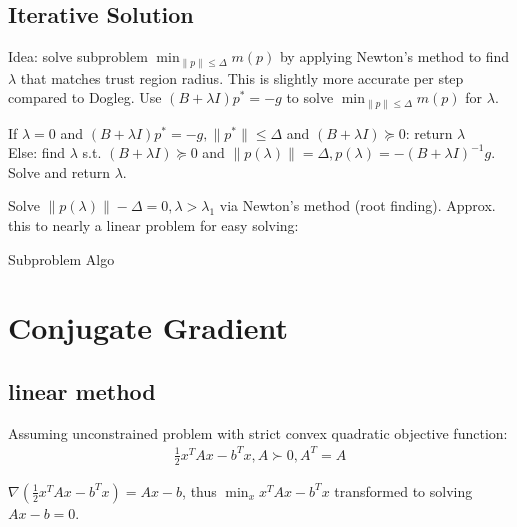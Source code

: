 \documentclass[8pt,letter]{article}
\begin{document}
\begin{multicols*}{2}
  \subsection{Iterative Solution}
  Idea: solve subproblem $\min_{\|p\| \leq \Delta} m(p)$ by applying Newton's method to find $\lambda$ that matches trust region radius. This is slightly more accurate per step compared to Dogleg. Use $(B+\lambda I)p^*=-g$ to solve $\min_{\|p\| \leq \Delta} m(p)$ for $\lambda$.

  If $\lambda=0$ and $(B+\lambda I)p^*=-g, \|p^*\| \leq \Delta$ and $(B+\lambda I) \succeq 0$: return $\lambda$\\
  Else: find $\lambda$ s.t. $(B+\lambda I) \succeq 0$ and $\|p(\lambda)\| = \Delta, p(\lambda)=-(B+\lambda I)^{-1}g$. Solve and return $\lambda$.
  
  Solve $\|p(\lambda)\|-\Delta=0, \lambda > \lambda_1$ via Newton's method (root finding). Approx. this to nearly a linear problem for easy solving:\\

  \begin{algorithm}[H]
    \caption{Subproblem Algo\label{Algo_TrustRegionIterativeSubproblem}}
  \end{algorithm}

  
  \vfill\null
  \pagebreak
  
  \section{Conjugate Gradient}

  \subsection{linear method}
  Assuming unconstrained problem with strict convex quadratic objective function:
  \begin{align*}
    \frac{1}{2} x^TAx-b^Tx, A \succ 0, A^T=A
  \end{align*}


  $\nabla(\frac{1}{2} x^TAx-b^Tx) = Ax-b$, thus $\min_x x^TAx - b^Tx$ transformed to solving $Ax-b=0$. 


\end{multicols*}
\end{document}
